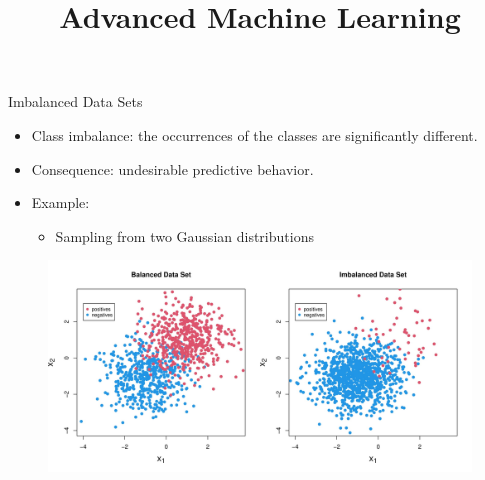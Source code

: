 \documentclass[11pt,compress,t,notes=noshow, xcolor=table]{beamer}
\title{Advanced Machine Learning}
\date{}
\begin{document}



\sloppy

\begin{vbframe}{Imbalanced Data Sets}
%		    
            \begin{itemize}
		        \item Class imbalance: the occurrences of the classes are significantly different. 		     
		        \item Consequence: undesirable predictive behavior.	    
		        \item 	Example:
		        \begin{itemize}
                \small    
		            \item Sampling from two Gaussian distributions 
		        \end{itemize}		    
		    \end{itemize}
		   
			\begin{figure}
				\centering
				\includegraphics[width=0.7\linewidth]{figure_man/combined_data_plots.jpg}
			\end{figure}
%
\end{vbframe}
\end{document}
